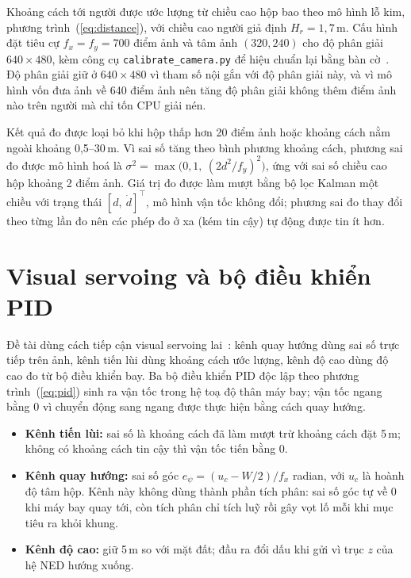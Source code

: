 Khoảng cách tới người được ước lượng từ chiều cao hộp bao theo mô hình lỗ kim, phương trình~(\ref{eq:distance}), với chiều cao người giả định $H_r = 1{,}7$\,m. Cấu hình đặt tiêu cự $f_x = f_y = 700$ điểm ảnh và tâm ảnh $(320, 240)$ cho độ phân giải $640\times480$, kèm công cụ \texttt{calibrate\_camera.py} để hiệu chuẩn lại bằng bàn cờ~\cite{zhang2000calibration}. Độ phân giải giữ ở $640\times480$ vì tham số nội gắn với độ phân giải này, và vì mô hình vốn đưa ảnh về 640 điểm ảnh nên tăng độ phân giải không thêm điểm ảnh nào trên người mà chỉ tốn CPU giải nén.

Kết quả đo được loại bỏ khi hộp thấp hơn 20 điểm ảnh hoặc khoảng cách nằm ngoài khoảng 0,5--30\,m. Vì sai số tăng theo bình phương khoảng cách, phương sai đo được mô hình hoá là $\sigma^2 = \max\big(0{,}1,\ (2d^2/f_y)^2\big)$, ứng với sai số chiều cao hộp khoảng 2 điểm ảnh. Giá trị đo được làm mượt bằng bộ lọc Kalman một chiều với trạng thái $[d,\ \dot d]^\top$, mô hình vận tốc không đổi; phương sai đo thay đổi theo từng lần đo nên các phép đo ở xa (kém tin cậy) tự động được tin ít hơn.

\section{Visual servoing và bộ điều khiển PID}

Đề tài dùng cách tiếp cận visual servoing lai~\cite{chaumette2006visual}: kênh quay hướng dùng sai số trực tiếp trên ảnh, kênh tiến lùi dùng khoảng cách ước lượng, kênh độ cao dùng độ cao đo từ bộ điều khiển bay. Ba bộ điều khiển PID độc lập theo phương trình~(\ref{eq:pid}) sinh ra vận tốc trong hệ toạ độ thân máy bay; vận tốc ngang bằng 0 vì chuyển động sang ngang được thực hiện bằng cách quay hướng.

\begin{itemize}
\item \textbf{Kênh tiến lùi:} sai số là khoảng cách đã làm mượt trừ khoảng cách đặt 5\,m; không có khoảng cách tin cậy thì vận tốc tiến bằng 0.
\item \textbf{Kênh quay hướng:} sai số góc $e_\psi = (u_c - W/2)/f_x$ radian, với $u_c$ là hoành độ tâm hộp. Kênh này không dùng thành phần tích phân: sai số góc tự về 0 khi máy bay quay tới, còn tích phân chỉ tích luỹ rồi gây vọt lố mỗi khi mục tiêu ra khỏi khung.
\item \textbf{Kênh độ cao:} giữ 5\,m so với mặt đất; đầu ra đổi dấu khi gửi vì trục $z$ của hệ NED hướng xuống.
\end{itemize}

